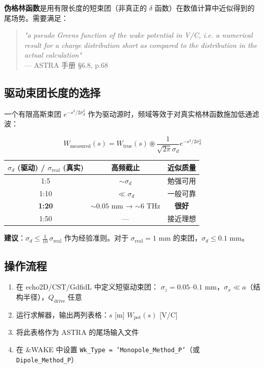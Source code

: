 \documentclass[a4paper,11pt]{article}
\begin{document}
\textbf{伪格林函数}是用有限长度的短束团（非真正的 $\delta$ 函数）在数值计算中近似得到的尾场势。需要满足：

\begin{quote}
\textit{"a pseudo Greens function of the wake potential in V/C, i.e. a numerical result for a charge distribution short as compared to the distribution in the actual calculation"} \\
\hfill — ASTRA 手册 §6.8, p.68
\end{quote}

\subsection{驱动束团长度的选择}

一个有限高斯束团 $e^{-s^2/2\sigma_d^2}$ 作为驱动源时，频域等效于对真实格林函数施加低通滤波：

\begin{equation}
  W_{\text{measured}}(s) = W_{\text{true}}(s) \circledast \frac{1}{\sqrt{2\pi}\sigma_d} e^{-s^2/2\sigma_d^2}
\end{equation}

\begin{center}
\begin{tabular}{ccc}
\toprule
$\sigma_d$ (驱动) / $\sigma_{\text{real}}$ (真实) & 高频截止 & 近似质量 \\
\midrule
1:5   & $\sim\sigma_d$ & 勉强可用 \\
1:10  & $\ll\sigma_d$ & 一般可靠 \\
\textbf{1:20} & $\sim0.05$ mm → $\sim6$ THz & \textbf{很好} \\
1:50  & — & 接近理想 \\
\bottomrule
\end{tabular}
\end{center}

\textbf{建议}：$\sigma_d \leq \frac{1}{10}\,\sigma_{\text{real}}$ 作为经验准则。对于 $\sigma_{\text{real}} = 1$ mm 的束团，$\sigma_d \leq 0.1$ mm。

\subsection{操作流程}

\begin{enumerate}
  \item 在 echo2D/CST/GdfidL 中定义短驱动束团：
        $\sigma_z = 0.05$--$0.1$ mm，$\sigma_x \ll a$（结构半径），$Q_{\text{drive}}$ 任意
  \item 运行求解器，输出两列表格：$s$ [m] \quad $W_{\text{pot}}(s)$ [V/C]
  \item 将此表格作为 ASTRA 的尾场输入文件
  \item 在 \&WAKE 中设置 \texttt{Wk\_Type = 'Monopole\_Method\_P'}（或 \texttt{Dipole\_Method\_P}）
\end{enumerate}
\end{document}
